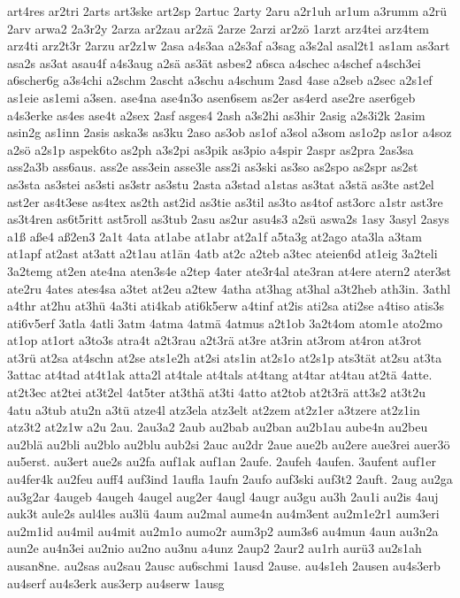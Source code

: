 {art4res
ar2tri
2arts
art3ske
art2sp
2artuc
2arty
2aru
a2r1uh
ar1um
a3rumm
a2rü
2arv
arwa2
2a3r2y
2arza
ar2zau
ar2zä
2arze
2arzi
ar2zö
1arzt
arz4tei
arz4tem
arz4ti
arz2t3r
2arzu
ar2z1w
2asa
a4s3aa
a2s3af
a3sag
a3s2al
asal2t1
as1am
as3art
asa2s
as3at
asau4f
a4s3aug
a2sä
as3ät
asbes2
a6sca
a4schec
a4schef
a4sch3ei
a6scher6g
a3s4chi
a2schm
2ascht
a3schu
a4schum
2asd
4ase
a2seb
a2sec
a2s1ef
as1eie
as1emi
a3sen.
ase4na
ase4n3o
asen6sem
as2er
as4erd
ase2re
aser6geb
a4s3erke
as4es
ase4t
a2sex
2asf
asges4
2ash
a3s2hi
as3hir
2asig
a2s3i2k
2asim
asin2g
as1inn
2asis
aska3s
as3ku
2aso
as3ob
as1of
a3sol
a3som
as1o2p
as1or
a4soz
a2sö
a2s1p
aspek6to
as2ph
a3s2pi
as3pik
as3pio
a4spir
2aspr
as2pra
2as3sa
ass2a3b
ass6aus.
ass2e
ass3ein
asse3le
ass2i
as3ski
as3so
as2spo
as2spr
as2st
as3sta
as3stei
as3sti
as3str
as3stu
2asta
a3stad
a1stas
as3tat
a3stä
as3te
ast2el
ast2er
as4t3ese
as4tex
as2th
ast2id
as3tie
as3til
as3to
as4tof
ast3orc
a1str
ast3re
as3t4ren
as6t5ritt
ast5roll
as3tub
2asu
as2ur
asu4s3
a2sü
aswa2s
1asy
3asyl
2asys
a1ß
aße4
aß2en3
2a1t
4ata
at1abe
at1abr
at2a1f
a5ta3g
at2ago
ata3la
a3tam
at1apf
at2ast
at3att
a2t1au
at1än
4atb
at2c
a2teb
a3tec
ateien6d
at1eig
3a2teli
3a2temg
at2en
ate4na
aten3s4e
a2tep
4ater
ate3r4al
ate3ran
at4ere
atern2
ater3st
ate2ru
4ates
ates4sa
a3tet
at2eu
a2tew
4atha
at3hag
at3hal
a3t2heb
ath3in.
3athl
a4thr
at2hu
at3hü
4a3ti
ati4kab
ati6k5erw
a4tinf
at2is
ati2sa
ati2se
a4tiso
atis3s
ati6v5erf
3atla
4atli
3atm
4atma
4atmä
4atmus
a2t1ob
3a2t4om
atom1e
ato2mo
at1op
at1ort
a3to3s
atra4t
a2t3rau
a2t3rä
at3re
at3rin
at3rom
at4ron
at3rot
at3rü
at2sa
at4schn
at2se
ats1e2h
at2si
ats1in
at2s1o
at2s1p
ats3tät
at2su
at3ta
3attac
at4tad
at4t1ak
atta2l
at4tale
at4tals
at4tang
at4tar
at4tau
at2tä
4atte.
at2t3ec
at2tei
at3t2el
4at5ter
at3thä
at3ti
4atto
at2tob
at2t3rä
att3s2
at3t2u
4atu
a3tub
atu2n
a3tü
atze4l
atz3ela
atz3elt
at2zem
at2z1er
a3tzere
at2z1in
atz3t2
at2z1w
a2u
2au.
2au3a2
2aub
au2bab
au2ban
au2b1au
aube4n
au2beu
au2blä
au2bli
au2blo
au2blu
aub2si
2auc
au2dr
2aue
aue2b
au2ere
aue3rei
auer3ö
au5erst.
au3ert
aue2s
au2fa
auf1ak
auf1an
2aufe.
2aufeh
4aufen.
3aufent
auf1er
au4fer4k
au2feu
auff4
auf3ind
1aufla
1aufn
2aufo
auf3ski
auf3t2
2auft.
2aug
au2ga
au3g2ar
4augeb
4augeh
4augel
aug2er
4augl
4augr
au3gu
au3h
2au1i
au2is
4auj
auk3t
aule2s
aul4les
au3lü
4aum
au2mal
aume4n
au4m3ent
au2m1e2r1
aum3eri
au2m1id
au4mil
au4mit
au2m1o
aumo2r
aum3p2
aum3s6
au4mun
4aun
au3n2a
aun2e
au4n3ei
au2nio
au2no
au3nu
a4unz
2aup2
2aur2
au1rh
aurü3
au2s1ah
ausan8ne.
au2sas
au2sau
2ausc
au6schmi
1ausd
2ause.
au4s1eh
2ausen
au4s3erb
au4serf
au4s3erk
aus3erp
au4serw
1ausg
}
